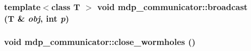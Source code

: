 \label{classmdp__communicator_ac735496a3b58e01cc8a7b5b76591f5c2}
\hypertarget{classmdp__communicator_a33af6d05c5f44bc69b5af721ed26c70e}{
\subsubsection[{broadcast}]{\setlength{\rightskip}{0pt plus 5cm}template$<$class T $>$ void mdp\_\-communicator::broadcast (T \& {\em obj}, \/  int {\em p})}}
\label{classmdp__communicator_a33af6d05c5f44bc69b5af721ed26c70e}
\hypertarget{classmdp__communicator_ad9941f7db0a5a447e37e8372b15f83f9}{
\subsubsection[{close\_\-wormholes}]{\setlength{\rightskip}{0pt plus 5cm}void mdp\_\-communicator::close\_\-wormholes ()}}
\label{classmdp__communicator_ad9941f7db0a5a447e37e8372b15f83f9}


